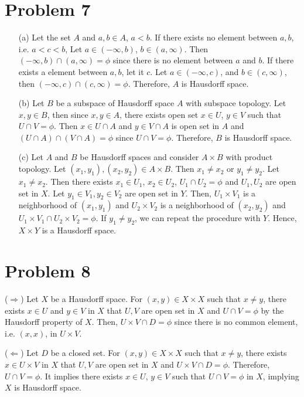 \documentclass{article}
\begin{document}
\section*{Problem 7}
\begin{enumerate}
\item[(a)] Let the set $A$ and $a,b\in A$, $a<b$. If there exists no element between $a, b$, i.e. $a<c<b$, Let $a\in (-\infty, b)$, $b\in(a,\infty)$. Then $(-\infty, b)\cap (a,\infty)=\phi$ since there is no element between $a$ and $b$. If there exists a element between $a,b$, let it $c$. Let $a\in(-\infty, c)$, and $b\in(c,\infty)$, then $(-\infty, c)\cap (c,\infty)=\phi$. Therefore, $A$ is Hausdorff space.
\item[(b)] Let $B$ be a subspace of Hausdorff space $A$ with subspace topology. Let $x,y\in B$, then since $x,y\in A$, there exists open set 
$x\in U$, $y\in V$ such that $U\cap V=\phi$. 
Then $x\in U\cap A$ and $y\in V\cap A$ 
is open set in $A$ and $\left(U\cap A\right)\cap \left(V\cap A\right)=\phi$ 
since $U\cap V=\phi$. Therefore, $B$ is Hausdorff space.
\item[(c)] 
Let $A$ and $B$ be Hausdorff spaces and consider $A\times B$ with product topology. Let $(x_1,y_1),(x_2,y_2)\in A\times B$. Then $x_1\neq x_2$ or $y_1\neq y_2$. Let $x_1\neq x_2$. 
Then there exists $x_1\in U_1$, $x_2\in U_2$, $U_1\cap U_2=\phi$ and $U_1,U_2$ are open set in $X$. Let $y_1\in V_1,y_2\in V_2$ are open set in $Y$. Then, $U_1\times V_1$ is 
a neighborhood of $(x_1,y_1)$ and $U_2\times V_2$ is a neighborhood of $(x_2,y_2)$ and $U_1\times V_1 \cap U_2\times V_2=\phi$. If $y_1\neq y_2$, we can repeat the procedure with $Y$. Hence, $X\times Y$ is a Hausdorff space.
\end{enumerate}
\section*{Problem 8}
($\Rightarrow$) Let $X$ be a Hausdorff space. For $(x,y)\in X\times X$ such that $x\neq y$, there exists $x\in U$ and $y\in V$ in $X$ that $U, V$ are open set in $X$ and $U\cap V=\phi$ by the Hausdorff property of $X$. Then, $U\times V \cap D=\phi$ since there is no common element, i.e. $(x,x)$, in $U\times V$.

($\Leftarrow$) Let $D$ be a closed set. For $(x,y)\in X\times X$ such that $x\neq y$, there exists $x\in U\times V$ in $X$ that $U, V$ are open set in $X$ and $U\times V\cap D=\phi$. Therefore, $U\cap V=\phi$. It implies there exists $x\in U$, $y\in V$ such that $U\cap V=\phi$ in $X$, implying $X$ is Hausdorff space.
\end{document}
